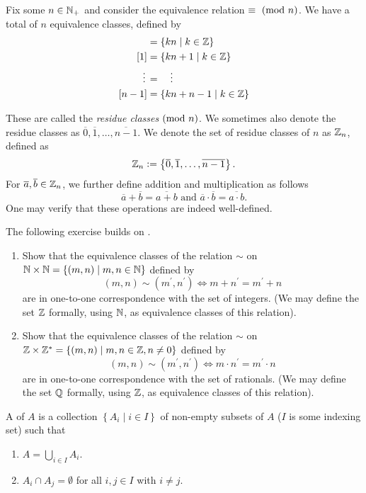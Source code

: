 \begin{ex}
    Fix some $n \in \mathbb{N}_+$ and consider the equivalence relation $\equiv \ (\mathrm{mod}\ n)$. We have a total of $n$ equivalence classes, defined by
\begin{align*}
    [0] &= \left\{ kn \mid k \in \Z \right\} \\
    [1] &= \left\{ kn + 1 \mid k \in \Z \right\} \\
    \vdots \, &= \quad \vdots \\
    [n-1] &= \left\{ kn + n-1 \mid k \in \Z \right\}
\end{align*}

These are called the \emph{residue classes$\ (\mathrm{mod}\ n)$}. We sometimes also denote the residue classes as $\overline{0}, \overline{1}, \ldots, \overline{n-1}$. We denote the set of residue classes of $n$ as $\mathbb{Z}_n$, defined as
\[
    \mathbb{Z}_n \vcentcolon= \left\{ \overline{0}, \overline{1}, \ldots, \overline{n-1} \right\}.
\]
For $\overline{a}, \overline{b} \in \mathbb{Z}_n$, we further define addition and multiplication as follows
\[
    \overline{a} + \overline{b} = \overline{a + b} \text{ and } \overline{a} \cdot \overline{b} = \overline{a \cdot b}.
\]
One may verify that these operations are indeed well-defined.
\end{ex}
\begin{exe}
The following exercise builds on .
\begin{enumerate}
    \item Show that the equivalence classes of the relation $\sim$ on $\mathbb{N} \times \mathbb{N} = \left\{ (m,n) \mid m,n \in \mathbb{N} \right\}$ defined by
    \[
        (m,n) \sim (m^{\prime}, n^{\prime}) \iff m + n^{\prime} = m^{\prime} + n
    \]
    are in one-to-one correspondence with the set of integers. (We may define the set $\mathbb{Z}$ formally, using $\mathbb{N}$, as equivalence classes of this relation).
    
    \item Show that the equivalence classes of the relation $\sim$ on $\mathbb{Z} \times \mathbb{Z}^{\ast} = \left\{ (m,n) \mid m,n \in \mathbb{Z}, n \neq 0 \right\}$ defined by
    \[
        (m,n) \sim (m^{\prime}, n^{\prime}) \iff m \cdot n^{\prime} = m^{\prime} \cdot n
    \]
    are in one-to-one correspondence with the set of rationals. (We may define the set $\mathbb{Q}$ formally, using $\mathbb{Z}$, as equivalence classes of this relation).
\end{enumerate}
\end{exe}

\begin{defn} 
    A  of $A$ is a collection $\left\{ A_i \mid i \in I \right\}$ of non-empty subsets of $A$ ($I$ is some indexing set) such that
    \begin{enumerate}
        \item $A = \bigcup_{i \in I} A_i$.
        \item $A_i \cap A_j = \emptyset$ for all $i,j \in I$ with $i \neq j$.
    \end{enumerate}
\end{defn}

